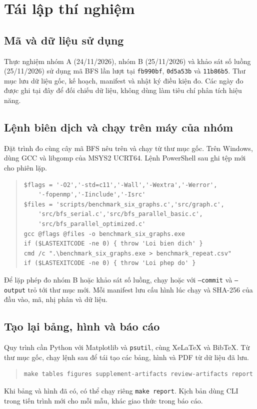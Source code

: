 \chapter{Tái lập thí nghiệm}
\label{app:reproduce}

\section{Mã và dữ liệu sử dụng}
Thực nghiệm nhóm A (24/11/2026), nhóm B (25/11/2026) và khảo sát số luồng (25/11/2026) sử dụng mã BFS lần lượt tại \texttt{fb990bf}, \texttt{0d5a53b} và \texttt{11b86b5}. Thư mục  lưu dữ liệu gốc, kế hoạch, manifest và nhật ký điều kiện đo. Các ngày đo được ghi tại đây để đối chiếu dữ liệu, không dùng làm tiêu chí phân tích hiệu năng.

\section{Lệnh biên dịch và chạy trên máy của nhóm}
Đặt trình đo cùng cây mã BFS nêu trên và chạy từ thư mục gốc. Trên Windows, dùng GCC và libgomp của MSYS2 UCRT64. Lệnh PowerShell sau ghi tệp mới cho phiên lặp.
\begin{quote}\small\singlespacing
\begin{verbatim}
$flags = '-O2','-std=c11','-Wall','-Wextra','-Werror',
    '-fopenmp','-Iinclude','-Isrc'
$files = 'scripts/benchmark_six_graphs.c','src/graph.c',
    'src/bfs_serial.c','src/bfs_parallel_basic.c',
    'src/bfs_parallel_optimized.c'
gcc @flags @files -o benchmark_six_graphs.exe
if ($LASTEXITCODE -ne 0) { throw 'Loi bien dich' }
cmd /c ".\benchmark_six_graphs.exe > benchmark_repeat.csv"
if ($LASTEXITCODE -ne 0) { throw 'Loi phep do' }
\end{verbatim}
\end{quote}
Để lặp phép đo nhóm B hoặc khảo sát số luồng, chạy  hoặc  với \texttt{--commit} và \texttt{--output} trỏ tới thư mục mới. Mỗi manifest lưu cấu hình lúc chạy và SHA-256 của đầu vào, mã, nhị phân và dữ liệu.

\section{Tạo lại bảng, hình và báo cáo}
Quy trình cần Python với Matplotlib và \texttt{psutil}, cùng XeLaTeX và BibTeX.
Từ thư mục gốc, chạy lệnh sau để tái tạo các bảng, hình và PDF từ dữ liệu đã lưu.
\begin{quote}\small
\begin{verbatim}
make tables figures supplement-artifacts review-artifacts report
\end{verbatim}
\end{quote}
Khi bảng và hình đã có, có thể chạy riêng \texttt{make report}.
Kịch bản  dùng CLI trong tiến trình mới cho mỗi mẫu, khác giao thức trong báo cáo.


